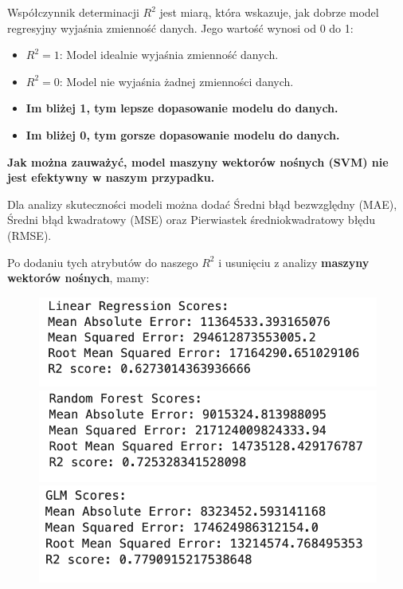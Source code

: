 \documentclass{article}
\begin{document}
Współczynnik determinacji \( R^2 \) jest miarą, która wskazuje, jak dobrze model regresyjny wyjaśnia zmienność danych. Jego wartość wynosi od 0 do 1:

\begin{itemize}
    \item \textbf{\( R^2 = 1 \)}: Model idealnie wyjaśnia zmienność danych.
    \item \textbf{\( R^2 = 0 \)}: Model nie wyjaśnia żadnej zmienności danych.
    \item \textbf{Im bliżej 1, tym lepsze dopasowanie modelu do danych.}
    \item \textbf{Im bliżej 0, tym gorsze dopasowanie modelu do danych.}
\end{itemize}


\textbf{Jak można zauważyć, model maszyny wektorów nośnych (SVM) nie jest efektywny w naszym przypadku.}

Dla analizy skuteczności modeli można dodać Średni błąd bezwzględny (MAE), Średni błąd kwadratowy (MSE) oraz Pierwiastek średniokwadratowy błędu (RMSE).

Po dodaniu tych atrybutów do naszego \( R^2 \)
  i usunięciu z analizy \textbf{maszyny wektorów nośnych}, mamy:

\begin{figure}[H]
    \centering
    \begin{minipage}{0.3\textwidth}
        \centering
        \includegraphics[width=\linewidth]{LReg.png}
    \end{minipage}
    \hfill
    \begin{minipage}{0.3\textwidth}
        \centering
        \includegraphics[width=\linewidth]{RF.png}
    \end{minipage}
    \hfill
    \begin{minipage}{0.3\textwidth}
        \centering
        \includegraphics[width=\linewidth]{GLM.png}

    \end{minipage}
\end{figure}
\end{document}
